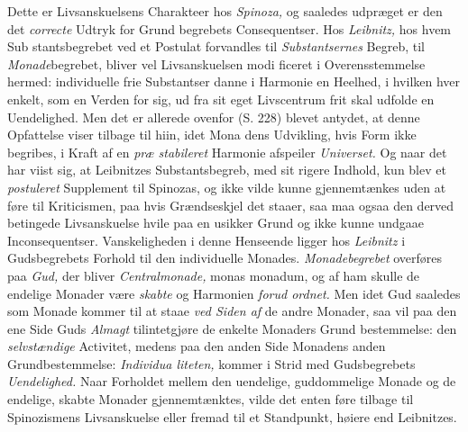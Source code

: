 Dette er Livsanskuelsens Charakteer hos \emph{Spinoza,} og
saaledes udpræget er den det \emph{correcte} Udtryk for Grund\-%
begrebets Consequentser. Hos \emph{Leibnitz,} hos hvem Sub\-%
stantsbegrebet ved et Postulat forvandles til \emph{Substantsernes}
Begreb, til \emph{Monade}begrebet, bliver vel Livsanskuelsen modi\-%
ficeret i Overensstemmelse hermed: individuelle frie Substantser
danne i Harmonie en Heelhed, i hvilken hver enkelt, som en
Verden for sig, ud fra sit eget Livscentrum frit skal udfolde
en Uendelighed. Men det er allerede ovenfor (S. 228) blevet
antydet, at denne Opfattelse viser tilbage til hiin, idet Mona\-%
dens Udvikling, hvis Form ikke begribes, i Kraft af en \emph{præ\-%
stabileret} Harmonie afspeiler \emph{Universet.} Og naar det
har viist sig, at Leibnitzes Substantsbegreb, med sit rigere
Indhold, kun blev et \emph{postuleret} Supplement til Spinozas, og
ikke vilde kunne gjennemtænkes uden at føre til Kriticismen,
paa hvis Grændseskjel det staaer, saa maa ogsaa den derved
betingede Livsanskuelse hvile paa en usikker Grund og ikke
kunne undgaae Inconsequentser. Vanskeligheden i denne
Henseende ligger hos \emph{Leibnitz} i Gudsbegrebets Forhold til
den individuelle Monades. \emph{Monadebegrebet} overføres paa
\emph{Gud,} der bliver \emph{Centralmonade,} monas monadum, og af
ham skulle de endelige Monader være \emph{skabte} og Harmonien
\emph{forud ordnet.} Men idet Gud saaledes som Monade kommer
til at staae \emph{ved Siden af} de andre Monader, saa vil paa den
ene Side Guds \emph{Almagt} tilintetgjøre de enkelte Monaders Grund\-%
bestemmelse: den \emph{selvstændige} Activitet, medens paa den
anden Side Monadens anden Grundbestemmelse: \emph{Individua\-%
liteten,} kommer i Strid med Gudsbegrebets \emph{Uendelighed.}
Naar Forholdet mellem den uendelige, guddommelige Monade
og de endelige, skabte Monader gjennemtænktes, vilde det
enten føre tilbage til Spinozismens Livsanskuelse eller fremad
til et Standpunkt, høiere end Leibnitzes.


